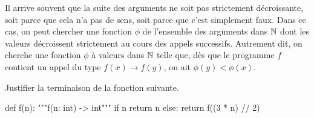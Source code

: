 \documentclass{magnolia}
\begin{document}
\vspace{2ex}
Il arrive souvent que la suite des arguments ne soit
pas strictement décroissante, soit parce que cela n'a pas de sens, soit parce que c'est simplement faux.
Dans ce cas, on peut chercher une fonction $\phi$ de l'ensemble des
arguments dans $\mathbb{N}$ dont les valeurs décroissent strictement au cours des
appels successifs. Autrement dit,
on cherche une fonction $\phi$ à valeurs dans $\mathbb{N}$ telle que, dès que le
programme $f$ contient un appel du type $f(x) \to f(y)$, on ait
$\phi(y) < \phi(x)$.
\vspace{2ex}
\begin{exoUnique}
\exo
  Justifier la terminaison de la fonction suivante.
\begin{pythoncodeline}
def f(n):
    """f(n: int) -> int"""
    if n %
        return n
    else:
        return f((3 * n) // 2)
\end{pythoncodeline}
\end{exoUnique}



\end{document}
